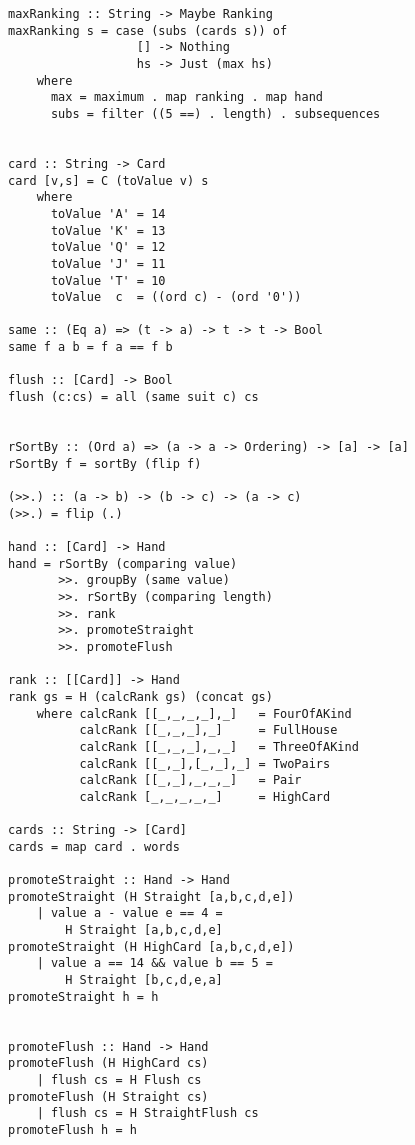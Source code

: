 \begin{lstlisting}[frame=single]
maxRanking :: String -> Maybe Ranking
maxRanking s = case (subs (cards s)) of
                  [] -> Nothing
                  hs -> Just (max hs)
    where 
      max = maximum . map ranking . map hand
      subs = filter ((5 ==) . length) . subsequences 


card :: String -> Card
card [v,s] = C (toValue v) s
    where 
      toValue 'A' = 14
      toValue 'K' = 13
      toValue 'Q' = 12
      toValue 'J' = 11
      toValue 'T' = 10
      toValue  c  = ((ord c) - (ord '0'))

same :: (Eq a) => (t -> a) -> t -> t -> Bool
same f a b = f a == f b

flush :: [Card] -> Bool
flush (c:cs) = all (same suit c) cs


rSortBy :: (Ord a) => (a -> a -> Ordering) -> [a] -> [a]
rSortBy f = sortBy (flip f)

(>>.) :: (a -> b) -> (b -> c) -> (a -> c)
(>>.) = flip (.)

hand :: [Card] -> Hand
hand = rSortBy (comparing value)
       >>. groupBy (same value)
       >>. rSortBy (comparing length)
       >>. rank
       >>. promoteStraight
       >>. promoteFlush    

rank :: [[Card]] -> Hand
rank gs = H (calcRank gs) (concat gs)  
    where calcRank [[_,_,_,_],_]   = FourOfAKind 
          calcRank [[_,_,_],_]     = FullHouse
          calcRank [[_,_,_],_,_]   = ThreeOfAKind
          calcRank [[_,_],[_,_],_] = TwoPairs
          calcRank [[_,_],_,_,_]   = Pair    
          calcRank [_,_,_,_,_]     = HighCard 

cards :: String -> [Card]
cards = map card . words 

promoteStraight :: Hand -> Hand
promoteStraight (H Straight [a,b,c,d,e]) 
    | value a - value e == 4 = 
        H Straight [a,b,c,d,e]
promoteStraight (H HighCard [a,b,c,d,e]) 
    | value a == 14 && value b == 5 = 
        H Straight [b,c,d,e,a]
promoteStraight h = h


promoteFlush :: Hand -> Hand
promoteFlush (H HighCard cs) 
    | flush cs = H Flush cs
promoteFlush (H Straight cs) 
    | flush cs = H StraightFlush cs
promoteFlush h = h
\end{lstlisting}
\lhend

